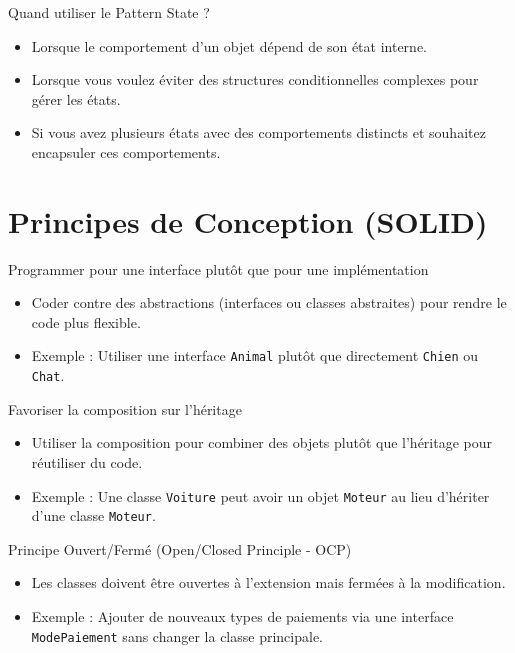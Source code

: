 \documentclass[aspectratio=169]{beamer}
\begin{document}
  \begin{frame}{Quand utiliser le Pattern State ?}
    \begin{itemize}
        \item Lorsque le comportement d'un objet dépend de son état interne.
        \item Lorsque vous voulez éviter des structures conditionnelles complexes pour gérer les états.
        \item Si vous avez plusieurs états avec des comportements distincts et souhaitez encapsuler ces comportements.
    \end{itemize}
  \end{frame}

  \section{Principes de Conception (SOLID)}

  \begin{frame}{Programmer pour une interface plutôt que pour une implémentation}
  \begin{itemize}
      \item Coder contre des abstractions (interfaces ou classes abstraites) pour rendre le code plus flexible.
      \item Exemple : Utiliser une interface \texttt{Animal} plutôt que directement \texttt{Chien} ou \texttt{Chat}.
  \end{itemize}
  \end{frame}

  \begin{frame}{Favoriser la composition sur l'héritage}
  \begin{itemize}
      \item Utiliser la composition pour combiner des objets plutôt que l'héritage pour réutiliser du code.
      \item Exemple : Une classe \texttt{Voiture} peut avoir un objet \texttt{Moteur} au lieu d'hériter d'une classe \texttt{Moteur}.
  \end{itemize}
  \end{frame}

  \begin{frame}{Principe Ouvert/Fermé (Open/Closed Principle - OCP)}
  \begin{itemize}
      \item Les classes doivent être ouvertes à l'extension mais fermées à la modification.
      \item Exemple : Ajouter de nouveaux types de paiements via une interface \texttt{ModePaiement} sans changer la classe principale.
  \end{itemize}
  \end{frame}
\end{document}
